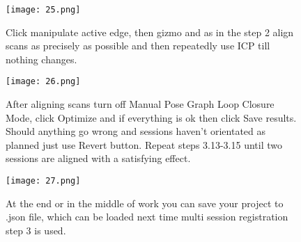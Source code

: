 \begin{figure}[H]
	\centering
	\texttt{[image: 25.png]}
	\caption{Click manipulate active edge, then gizmo and as in the step 2 align scans as precisely as possible and then repeatedly use ICP till nothing changes.}
	\label{fig:25}
\end{figure}

\begin{figure}[H]
	\centering
	\texttt{[image: 26.png]}
	\caption{After aligning scans turn off Manual Pose Graph Loop Closure Mode, click Optimize and if everything is ok then click Save results. Should anything go wrong and sessions haven't orientated as planned just use Revert button. Repeat steps 3.13-3.15 until two sessions are aligned with a satisfying effect.}
	\label{fig:26}
\end{figure}

\begin{figure}[H]
	\centering
	\texttt{[image: 27.png]}
	\caption{At the end or in the middle of work you can save your project to .json file, which can be loaded next time multi session registration step 3 is used.}
	\label{fig:27}
\end{figure}